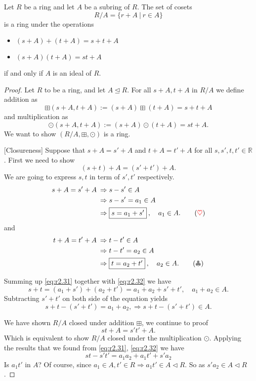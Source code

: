 \begin{theorem}
    Let $R$ be a ring and let $A$ be a subring of $R$. The set of cosets 
    \[
        R/A = \{ r+A \> | \> r \in A \}
    \]
    is a ring under the operations 
    \begin{itemize}
        \item $(s+A) + (t+A) = s + t + A$
        \item $(s+A)(t+A) = st + A$
    \end{itemize}
    if and only if $A$ is an ideal of $R$.
\end{theorem}
\begin{proof}
    Let $R$ to be a ring, and let $A \trianglelefteq R$. For all $s+A, t+A$ in $R/A$ we define 
    addition as 
    \[
        \boxplus (s+A, t+A) := (s+A) \boxplus (t + A) = s+t+A
    \]
    and multiplication as 
    \[
        \odot(s+A, t+A) := (s+A) \odot (t + A) = st+A.
    \]
    We want to show $(R/A, \boxplus, \odot)$ is a ring.

    [Closureness] Suppose that $s + A = s' + A$ and $t+A = t' + A$ for all $s, s', t, t' \in \mathbb{R}$. First we 
    need to show 
    \[
        (s+t) + A = (s' + t')+A. 
    \]
    We are going to express $s, t$ in term of $s', t'$ respectively.
    \begin{align*}
        s + A = s' + A \> &\Rightarrow s - s' \in A\\
        &\Rightarrow s - s' = a_1 \in A\\
        &\Rightarrow \fbox{$s = a_1 + s'$}\>, \quad a_1 \in A. \label{eq:r2.31} \tag{{\color{red} $\heartsuit$}}
    \end{align*}
    and 
    \begin{align*}
        t + A = t' + A \> &\Rightarrow t - t' \in A\\
        &\Rightarrow t - t' = a_2 \in A\\
        &\Rightarrow \fbox{$t = a_2 + t'$}\>, \quad a_2 \in A. \label{eq:r2.32} \tag{{\color{gray} $\clubsuit $}}
    \end{align*}

    Summing up \eqref{eq:r2.31} together with \eqref{eq:r2.32} we have 
    \[
        s + t = (a_1 + s') + (a_2 + t') = a_1 + a_2 + s' + t', \quad a_1 + a_2 \in A.
    \]
    Subtracting $s'+t'$ on both side of the equation yields 
    \[
        s+t-(s'+t') = a_1 + a_2, \Longrightarrow s+t-(s'+t') \in A.
    \]

    We have shown $R/A$ closed under addition $\boxplus$, we continue to proof 
    \[
        st+A = s't' + A.
    \]
    Which is equivalent to show $R/A$ closed under the multiplication $\odot$. Applying 
    the results that we found from \eqref{eq:r2.31}, \eqref{eq:r2.32} we have 
    \[
        st -s't' = a_1 a_2 + a_1t' + s'a_2
    \]
    Is $a_1t'$ in $A$? Of course, since $a_1 \in A, t' \in R \Longrightarrow a_1t' \in A \triangleleft R$.
    So as $s'a_2 \in A \triangleleft R$.


\end{proof}
